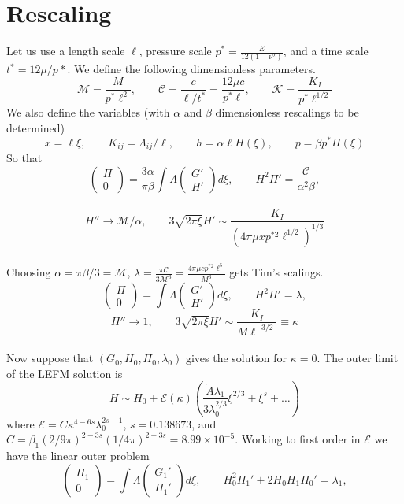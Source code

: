 \documentclass{article}
\newcommand{\cE}{\mathcal{E}}                               %
\newcommand{\cM}{\mathcal{M}}                               %
\newcommand{\cC}{\mathcal{C}}                               %
\newcommand{\cK}{\mathcal{K}}                               %
\begin{document}
\section{Rescaling}
Let us use a length scale $\ell$, pressure scale $p^* = \frac{E}{12(1-\nu^2)}$,
and a time scale $t^* = 12\mu/p*$. We define the following dimensionless
parameters.
\[\cM = \frac{M}{p^* \ell^2}, \qquad \cC = \frac{c}{\ell/t^*} = \frac{12\mu c}
{p^* \ell}, \qquad \cK = \frac{K_I}{p^* \ell ^{1/2}} \]
We also define the variables (with $\alpha$ and $\beta$ dimensionless 
rescalings to be determined)
\[ x = \ell \xi, \qquad K_{ij} = \Lambda_{ij}/ \ell, \qquad
h = \alpha \ell H(\xi), \qquad p = \beta p^* \Pi ( \xi) \] 
So that
\[ \left( \begin{array}{c} \Pi \\ 0 \end{array} \right)
= \frac{3\alpha}{\pi\beta} \int \Lambda 
 \left( \begin{array}{c} G' \\ H' \end{array} \right) d\xi, \qquad
H^2 \Pi' = \frac{\cC}{\alpha^2 \beta}, \] \\
\[ H'' \to \cM/\alpha, \qquad
3\sqrt{2\pi\xi}H' \sim \frac{K_I}{(4\pi \mu x p^{*2} \ell^{1/2})^{1/3}} \]
\\
Choosing $\alpha = \pi \beta/3 = \cM$, $\displaystyle \lambda = 
\frac{\pi \cC}{3 \cM^3} = \frac{4\pi \mu c p^{*2} \ell^5}{M^3}$ gets 
Tim's scalings. 
\[ \left( \begin{array}{c} \Pi \\ 0 \end{array} \right)
= \int \Lambda 
 \left( \begin{array}{c} G' \\ H' \end{array} \right) d\xi, \qquad
H^2 \Pi' = \lambda, \] 
\[ H'' \to 1, \qquad
3\sqrt{2\pi\xi}H' \sim \frac{K_I}{M \ell^{-3/2}} \equiv \kappa \]
\\
Now suppose that $(G_0, H_0, \Pi_0, \lambda_0)$ gives the solution for 
$\kappa=0$. The outer limit of the LEFM solution is
\[ H \sim H_0 + \cE(\kappa) \left( \frac{\tilde{A} \lambda_1}{3\lambda_0^{2/3}}
\xi^{2/3} + \xi^s + \dots \right) \]
where $\cE = C \kappa^{4-6s} \lambda_0^{2s-1}$, $s = 0.138673$, and 
$C = \beta_1 (2/9\pi)^{2-3s}(1/4\pi)^{2-3s} = 8.99 \times 10^{-5}$.
Working to first order in $\cE$ we have the linear outer problem
\[ \left( \begin{array}{c} \Pi_1 \\ 0 \end{array} \right)
= \int \Lambda 
 \left( \begin{array}{c} G_1' \\ H_1' \end{array} \right) d\xi, \qquad
H_0^2 \Pi_1' + 2 H_0H_1 \Pi_0'= \lambda_1, \] 
\end{document}

